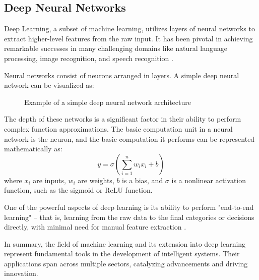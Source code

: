 \subsection*{Deep Neural Networks}
Deep Learning, a subset of machine learning, utilizes layers of neural networks to extract higher-level features from the raw input. It has been pivotal in achieving remarkable successes in many challenging domains like natural language processing, image recognition, and speech recognition \cite{LeCun2015Deep, Goodfellow2016Deep}.

Neural networks consist of neurons arranged in layers. A simple deep neural network can be visualized as:
\begin{figure}[htbp]
    \centering
    \caption{Example of a simple deep neural network architecture}
    \label{fig:dnn}
\end{figure}

The depth of these networks is a significant factor in their ability to perform complex function approximations. The basic computation unit in a neural network is the neuron, and the basic computation it performs can be represented mathematically as:
\begin{equation}
    y = \sigma(\sum_{i=1}^n w_ix_i + b)
\end{equation}
where \( x_i \) are inputs, \( w_i \) are weights, \( b \) is a bias, and \( \sigma \) is a nonlinear activation function, such as the sigmoid or ReLU function.

One of the powerful aspects of deep learning is its ability to perform "end-to-end learning" – that is, learning from the raw data to the final categories or decisions directly, with minimal need for manual feature extraction \cite{LeCun2015Deep}.

In summary, the field of machine learning and its extension into deep learning represent fundamental tools in the development of intelligent systems. Their applications span across multiple sectors, catalyzing advancements and driving innovation.